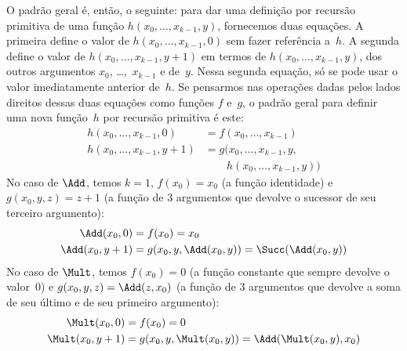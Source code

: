 \documentclass[../../../include/open-logic-section]{subfiles}
\begin{document}
O padrão geral é, então, o seguinte: para dar uma definição por recursão
primitiva de uma função $h(x_0, \dots, x_{k-1}, y)$, fornecemos duas equações.
A primeira define o valor de $h(x_0, \dots, x_{k-1}, 0)$ sem fazer referência
a~$h$. A segunda define o valor de $h(x_0, \dots, x_{k-1}, y+1)$ em termos de
$h(x_0, \dots, x_{k-1}, y)$, dos outros argumentos $x_0$,
\dots,~$x_{k-1}$ e de~$y$. Nessa segunda equação, só se pode usar o valor
imediatamente anterior de~$h$. Se pensarmos nas operações dadas pelos lados
direitos dessas duas equações como funções $f$ e~$g$, o padrão geral para
definir uma nova função~$h$ por recursão primitiva é este:
\begin{align*}
  h(x_0, \dots, x_{k-1}, 0) & = f(x_0, \dots, x_{k-1})\\
  h(x_0, \dots, x_{k-1}, y+1) & =
  g(x_0, \dots, x_{k-1}, y,\\
  &\qquad h(x_0, \dots, x_{k-1}, y))
\end{align*}  
No caso de $\Add$, temos $k=1$, $f(x_0) = x_0$ (a função identidade) e
$g(x_0, y, z) = z + 1$ (a função de $3$ argumentos que devolve o sucessor
de seu terceiro argumento):
\begin{align*}
  \Add(x_0, 0) & = f(x_0) = x_0\\
  \Add(x_0, y+1) & = g(x_0, y, \Add(x_0, y)) =
  \Succ(\Add(x_0, y))
\end{align*}
No caso de $\Mult$, temos $f(x_0) = 0$ (a função constante que sempre devolve
o valor~$0$) e $g(x_0, y, z) = \Add(z,x_0)$ (a função de $3$ argumentos que
devolve a soma de seu último e de seu primeiro argumento):
\begin{align*}
  \Mult(x_0,0) & =  f(x_0) = 0 \\
  \Mult(x_0,y+1) & =  g(x_0, y, \Mult(x_0,y)) =
  \Add(\Mult(x_0,y), x_0)
\end{align*}
\end{document}
